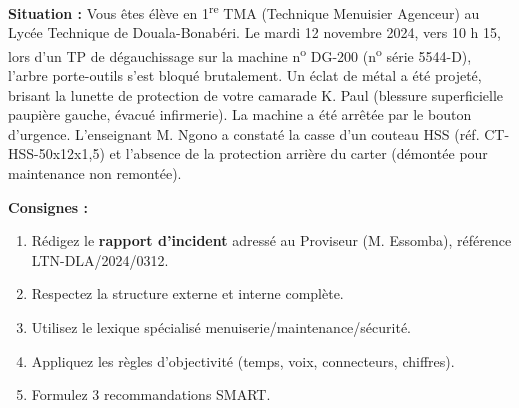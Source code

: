 \documentclass[11pt]{article}
\begin{document}
\begin{exercice}
\textbf{Situation :} Vous êtes élève en 1\textsuperscript{re} TMA (Technique Menuisier Agenceur) au Lycée Technique de Douala-Bonabéri. Le mardi 12 novembre 2024, vers 10 h 15, lors d'un TP de dégauchissage sur la machine n\textsuperscript{o} DG-200 (n\textsuperscript{o} série 5544-D), l'arbre porte-outils s'est bloqué brutalement. Un éclat de métal a été projeté, brisant la lunette de protection de votre camarade K. Paul (blessure superficielle paupière gauche, évacué infirmerie). La machine a été arrêtée par le bouton d'urgence. L'enseignant M. Ngono a constaté la casse d'un couteau HSS (réf. CT-HSS-50x12x1,5) et l'absence de la protection arrière du carter (démontée pour maintenance non remontée).

\textbf{Consignes :}
\begin{enumerate}
    \item Rédigez le \textbf{rapport d'incident} adressé au Proviseur (M. Essomba), référence LTN-DLA/2024/0312.
    \item Respectez la structure externe et interne complète.
    \item Utilisez le lexique spécialisé menuiserie/maintenance/sécurité.
    \item Appliquez les règles d'objectivité (temps, voix, connecteurs, chiffres).
    \item Formulez 3 recommandations SMART.
\end{enumerate}
\end{exercice}
\end{document}
